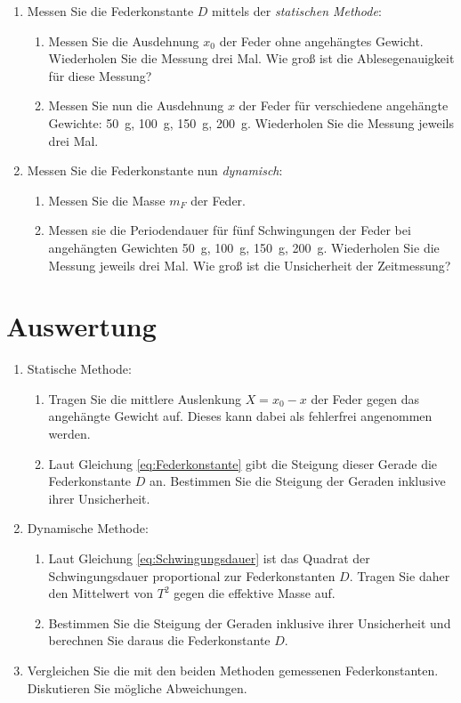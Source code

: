 \begin{enumerate}
	\item Messen Sie die Federkonstante $D$ mittels der \textit{statischen Methode}:
		\begin{enumerate}
			\item Messen Sie die Ausdehnung $x_0$ der Feder ohne angehängtes Gewicht. Wiederholen Sie die Messung drei Mal. Wie groß ist die Ablesegenauigkeit für diese Messung?
			\item Messen Sie nun die Ausdehnung $x$ der Feder für verschiedene angehängte Gewichte: 50~g, 100~g, 150~g, 200~g. Wiederholen Sie die Messung jeweils drei Mal.
		\end{enumerate}
	\item Messen Sie die Federkonstante nun \textit{dynamisch}:
		\begin{enumerate}
			\item Messen Sie die Masse $m_F$ der Feder.
			\item Messen sie die Periodendauer für fünf Schwingungen der Feder bei angehängten Gewichten 50~g, 100~g, 150~g, 200~g. Wiederholen Sie die Messung jeweils drei Mal. Wie groß ist die Unsicherheit der Zeitmessung?
		\end{enumerate}
\end{enumerate}

\section{Auswertung} 

\begin{enumerate}
	\item Statische Methode:
		\begin{enumerate}
			\item Tragen Sie die mittlere Auslenkung $X = x_0 - x$ der Feder gegen das angehängte Gewicht auf. Dieses kann dabei als fehlerfrei angenommen werden.
			\item Laut Gleichung \ref{eq:Federkonstante} gibt die Steigung dieser Gerade die Federkonstante $D$ an. Bestimmen Sie die Steigung der Geraden inklusive ihrer Unsicherheit.
		\end{enumerate}
	\item Dynamische Methode:
		\begin{enumerate}
			\item Laut Gleichung \ref{eq:Schwingungsdauer} ist das Quadrat der Schwingungsdauer proportional zur Federkonstanten $D$. Tragen Sie daher den Mittelwert von $T^2$ gegen die effektive Masse auf.
			\item Bestimmen Sie die Steigung der Geraden inklusive ihrer Unsicherheit und berechnen Sie daraus die Federkonstante $D$.
		\end{enumerate}
	\item Vergleichen Sie die mit den beiden Methoden gemessenen Federkonstanten. Diskutieren Sie mögliche Abweichungen.
\end{enumerate}
